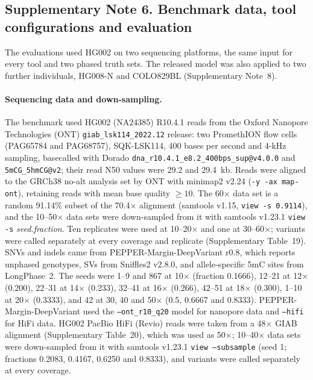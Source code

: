 \documentclass[11pt,a4paper]{article}
\newcommand{\toolname}{LongPhase~2\xspace}
\begin{document}
\clearpage
\subsection*{Supplementary Note 6. Benchmark data, tool configurations and evaluation}

The evaluations used HG002 on two sequencing platforms, the same input for every tool and two phased truth sets. The released model was also applied to two further individuals, HG008-N and COLO829BL (Supplementary Note~8).

\paragraph{Sequencing data and down-sampling.} The benchmark used HG002 (NA24385) R10.4.1 reads from the Oxford Nanopore Technologies (ONT) \texttt{giab\_lsk114\_2022.12} release: two PromethION flow cells (PAG65784 and PAG68757), SQK-LSK114, 400 bases per second and 4-kHz sampling, basecalled with Dorado \texttt{dna\_r10.4.1\_e8.2\_400bps\_sup@v4.0.0} and \texttt{5mCG\_5hmCG@v2}; their read N50 values were 29.2 and 29.4~kb.  Reads were aligned to the GRCh38 no-alt analysis set by ONT with minimap2 v2.24 (\texttt{-y -ax map-ont}), retaining reads with mean base quality $\ge 10$.  The 60$\times$ data set is a random 91.14\% subset of the 70.4$\times$ alignment (samtools v1.15, \texttt{view -s 0.9114}), and the 10--50$\times$ data sets were down-sampled from it with samtools v1.23.1\cite{danecek2021samtools} \texttt{view -s} \textit{seed.fraction}.  Ten replicates were used at 10--20$\times$ and one at 30--60$\times$; variants were called separately at every coverage and replicate (Supplementary Table~19).  SNVs and indels came from PEPPER-Margin-DeepVariant r0.8, which reports unphased genotypes, SVs from Sniffles2 v2.8.0, and allele-specific 5mC sites from \toolname.
The seeds were 1--9 and 867 at 10$\times$ (fraction 0.1666), 12--21 at 12$\times$ (0.200), 22--31 at 14$\times$ (0.233), 32--41 at 16$\times$ (0.266), 42--51 at 18$\times$ (0.300), 1--10 at 20$\times$ (0.3333), and 42 at 30, 40 and 50$\times$ (0.5, 0.6667 and 0.8333).  PEPPER-Margin-DeepVariant used the \texttt{--ont\_r10\_q20} model for nanopore data and \texttt{--hifi} for HiFi data.
HG002 PacBio HiFi (Revio) reads were taken from a 48$\times$ GIAB alignment (Supplementary Table~20), which was used as 50$\times$; 10--40$\times$ data sets were down-sampled from it with samtools v1.23.1 \texttt{view --subsample} (seed 1; fractions 0.2083, 0.4167, 0.6250 and 0.8333), and variants were called separately at every coverage.
\end{document}
